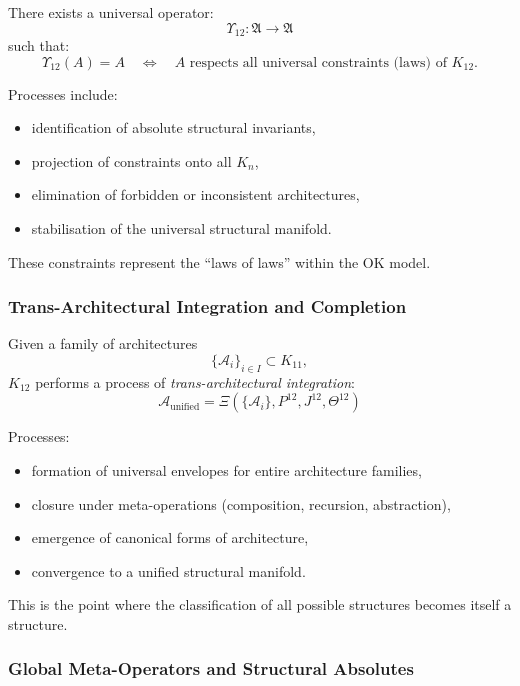 There exists a universal operator:
\[
\Upsilon_{12} : \mathfrak{A} \to \mathfrak{A}
\]
such that:
\[
\Upsilon_{12}(A) = A 
\quad \Longleftrightarrow \quad
A \text{ respects all universal constraints (laws) of } K_{12}.
\]

Processes include:
\begin{itemize}
    \item identification of absolute structural invariants,
    \item projection of constraints onto all $K_n$,
    \item elimination of forbidden or inconsistent architectures,
    \item stabilisation of the universal structural manifold.
\end{itemize}

These constraints represent the ``laws of laws'' within the OK model.

\subsubsection{Trans-Architectural Integration and Completion}

Given a family of architectures
\[
\{\mathcal{A}_i\}_{i \in I} \subset K_{11},
\]
$K_{12}$ performs a process of \emph{trans-architectural integration}:
\[
\mathcal{A}_{\text{unified}} 
= \Xi(\{\mathcal{A}_i\}, P^{12}, J^{12}, \Theta^{12})
\]

Processes:
\begin{itemize}
    \item formation of universal envelopes for entire architecture families,
    \item closure under meta-operations (composition, recursion, abstraction),
    \item emergence of canonical forms of architecture,
    \item convergence to a unified structural manifold.
\end{itemize}

This is the point where the classification of all possible structures becomes itself a structure.

\subsubsection{Global Meta-Operators and Structural Absolutes}

